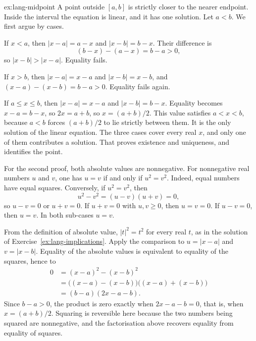 \begin{solution}{ex:lang-midpoint}
\idea A point outside $[a,b]$ is strictly closer to the nearer endpoint. Inside the interval the equation is linear, and it has one solution.
\writeup Let $a<b$. We first argue by cases.

If $x<a$, then $|x-a|=a-x$ and $|x-b|=b-x$. Their difference is
\[
(b-x)-(a-x)=b-a>0,
\]
so $|x-b|>|x-a|$. Equality fails.

If $x>b$, then $|x-a|=x-a$ and $|x-b|=x-b$, and $(x-a)-(x-b)=b-a>0$. Equality fails again.

If $a\le x\le b$, then $|x-a|=x-a$ and $|x-b|=b-x$. Equality becomes $x-a=b-x$, so $2x=a+b$, so $x=(a+b)/2$. This value satisfies $a<x<b$, because $a<b$ forces $(a+b)/2$ to lie strictly between them. It is the only solution of the linear equation. The three cases cover every real $x$, and only one of them contributes a solution. That proves existence and uniqueness, and identifies the point.

For the second proof, both absolute values are nonnegative. For nonnegative real numbers $u$ and $v$, one has $u=v$ if and only if $u^2=v^2$. Indeed, equal numbers have equal squares. Conversely, if $u^2=v^2$, then
\[
u^2-v^2=(u-v)(u+v)=0,
\]
so $u-v=0$ or $u+v=0$. If $u+v=0$ with $u,v\ge 0$, then $u=v=0$. If $u-v=0$, then $u=v$. In both sub-cases $u=v$.

From the definition of absolute value, $|t|^2=t^2$ for every real $t$, as in the solution of Exercise~\ref{ex:lang-implications}. Apply the comparison to $u=|x-a|$ and $v=|x-b|$. Equality of the absolute values is equivalent to equality of the squares, hence to
\begin{align*}
0&=(x-a)^2-(x-b)^2\\
&=\bigl((x-a)-(x-b)\bigr)\bigl((x-a)+(x-b)\bigr)\\
&=(b-a)(2x-a-b).
\end{align*}
Since $b-a>0$, the product is zero exactly when $2x-a-b=0$, that is, when $x=(a+b)/2$. Squaring is reversible here because the two numbers being squared are nonnegative, and the factorisation above recovers equality from equality of squares.
\end{solution}


